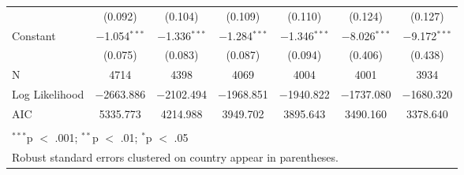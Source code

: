 \begin{table}[!htbp]
\begin{tabular}{@{\extracolsep{5pt}}lcccccc}
  & (0.092) & (0.104) & (0.109) & (0.110) & (0.124) & (0.127) \\ 
  Constant & $-$1.054$^{***}$ & $-$1.336$^{***}$ & $-$1.284$^{***}$ & $-$1.346$^{***}$ & $-$8.026$^{***}$ & $-$9.172$^{***}$ \\ 
  & (0.075) & (0.083) & (0.087) & (0.094) & (0.406) & (0.438) \\ 
 N & 4714 & 4398 & 4069 & 4004 & 4001 & 3934 \\ 
Log Likelihood & $-$2663.886 & $-$2102.494 & $-$1968.851 & $-$1940.822 & $-$1737.080 & $-$1680.320 \\ 
AIC & 5335.773 & 4214.988 & 3949.702 & 3895.643 & 3490.160 & 3378.640 \\ 
\hline \\[-1.8ex] 
\multicolumn{7}{l}{$^{***}$p $<$ .001; $^{**}$p $<$ .01; $^{*}$p $<$ .05} \\ 
\multicolumn{7}{l}{Robust standard errors clustered on country appear in parentheses.} \\ 
\end{tabular} 
\end{table} 
